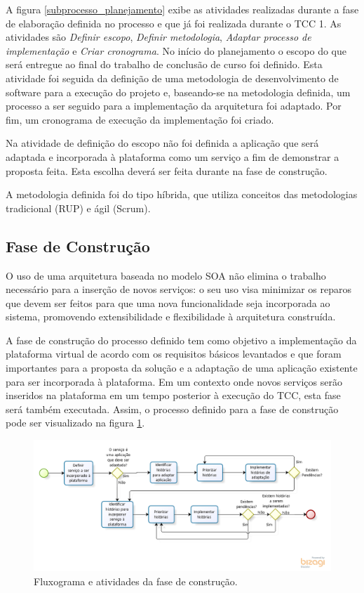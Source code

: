 A figura \ref{subprocesso_planejamento} exibe as atividades realizadas durante a fase de elaboração definida no processo e que já foi realizada durante o TCC 1. As atividades são \textit{Definir escopo}, \textit{Definir metodologia}, \textit{Adaptar processo de implementação} e \textit{Criar cronograma}. No início do planejamento o escopo do que será entregue ao final do trabalho de conclusão de curso foi definido. Esta atividade foi seguida da definição de uma metodologia de desenvolvimento de software para a execução do projeto e, baseando-se na metodologia definida, um processo a ser seguido para a implementação da arquitetura foi adaptado. Por fim, um cronograma de execução da implementação foi criado.

Na atividade de definição do escopo não foi definida a aplicação que será adaptada e incorporada à plataforma como um serviço a fim de demonstrar a proposta feita. Esta escolha deverá ser feita durante na fase de construção.

A metodologia definida foi do tipo híbrida, que utiliza conceitos das metodologias tradicional (RUP) e ágil (Scrum).

\subsection{Fase de Construção}
O uso de uma arquitetura baseada no modelo SOA não elimina o trabalho necessário para a inserção de novos serviços: o seu uso visa minimizar os reparos que devem ser feitos para que uma nova funcionalidade seja incorporada ao sistema, promovendo extensibilidade e flexibilidade à arquitetura construída.

A fase de construção do processo definido tem como objetivo a implementação da plataforma virtual de acordo com os requisitos básicos levantados e que foram importantes para a proposta da solução e a adaptação de uma aplicação existente para ser incorporada à plataforma. Em um contexto onde novos serviços serão inseridos na plataforma em um tempo posterior à execução do TCC, esta fase será também executada. Assim, o processo definido para a fase de construção pode ser visualizado na figura \ref{subprocesso_implementacao}.

\begin{figure}[htb]
\centering
\includegraphics[width=1\textwidth]{figuras/subprocesso_implementacao.PNG}
\caption{Fluxograma e atividades da fase de construção.}
\label{subprocesso_implementacao}
\end{figure}

